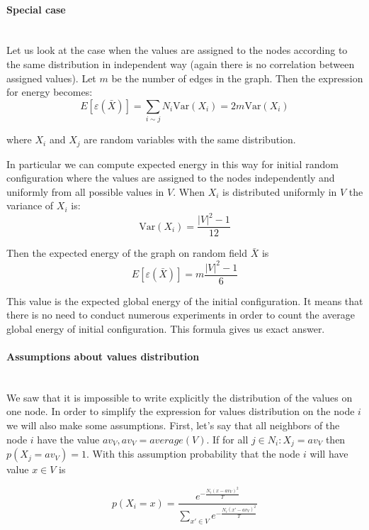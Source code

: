 \documentclass[12pt]{report}
\begin{document}
\paragraph{Special case}
\mbox{} \\
Let us look at the case when the values are assigned to the nodes according to the same distribution in independent way (again there is no correlation between assigned values). Let $m$ be the number of edges in the graph. Then the expression for energy becomes:
$$ E[\varepsilon (\bar{X})] =  \sum_{i \sim j} N_i\mathrm{Var}(X_i) = 2m\mathrm{Var}(X_i)$$

where $X_i$ and $X_j$ are random variables with the same distribution.


In particular we can compute expected energy in this way for initial random configuration where the values are assigned to the nodes independently and uniformly from all possible values in $V$. 
When $X_i$ is distributed uniformly in $V$ the variance of $X_i$ is:
$$\mathrm{Var}(X_i) = \frac{|V|^2-1}{12}$$

Then the expected energy of the graph on random field $\bar{X}$ is
$$E[\varepsilon (\bar{X})] =  m\frac{|V|^2-1}{6}$$

This value is the expected global energy of the initial configuration. It means that there is no need to conduct numerous experiments in order to count the average global energy of initial configuration. This formula gives us exact answer.

\paragraph{Assumptions about values distribution}
\mbox{} \\

We saw that it is impossible to write explicitly the distribution of the values on one node. In order to simplify the expression for values distribution on the node $i$ we will also make some assumptions. First, let's say that all neighbors of the node $i$ have the value $av_V, av_V = average(V)$. If for all $j \in N_i : X_j = av_V$ then 
$p(X_j  = av_V) = 1$. With this assumption probability that the node $i$ will have value $x \in V$ is

\begin{equation}
\label{eq:simpleDisrt}
 p(X_i = x) = 
\frac{ e^{-\frac{N_i(x - av_V)^2}{T}} }{ \sum\limits_{x'\in V} e^{-\frac{N_i(x' - av_V)^2}{T}}}
\end{equation}
\end{document}
